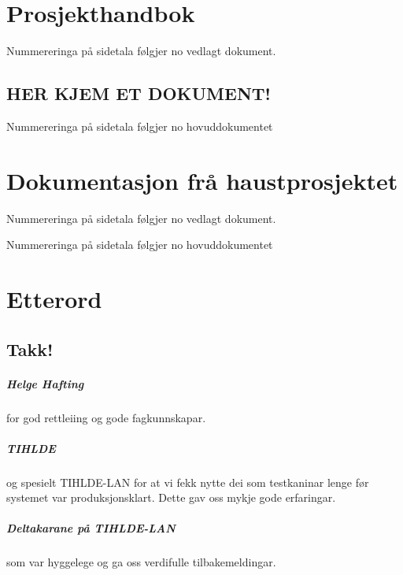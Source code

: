 \documentclass[nynorsk,12pt,a4paper,oneside]{book}
\begin{document}
\chapter{Prosjekthandbok}
	Nummereringa på sidetala følgjer no vedlagt dokument.
%	
	\section*{HER KJEM ET DOKUMENT!}
	Nummereringa på sidetala følgjer no hovuddokumentet
\chapter{Dokumentasjon frå haustprosjektet}
		Nummereringa på sidetala følgjer no vedlagt dokument.
	
	Nummereringa på sidetala følgjer no hovuddokumentet

\backmatter
\chapter{Etterord}
\section{Takk!}
\paragraph{Helge Hafting} for god rettleiing og gode fagkunnskapar.
\paragraph{TIHLDE} og spesielt TIHLDE-LAN for at vi fekk nytte dei som testkaninar lenge før systemet var produksjonsklart. Dette gav oss mykje gode erfaringar.
\paragraph{Deltakarane på TIHLDE-LAN} som var hyggelege og ga oss verdifulle tilbakemeldingar.
\end{document}
